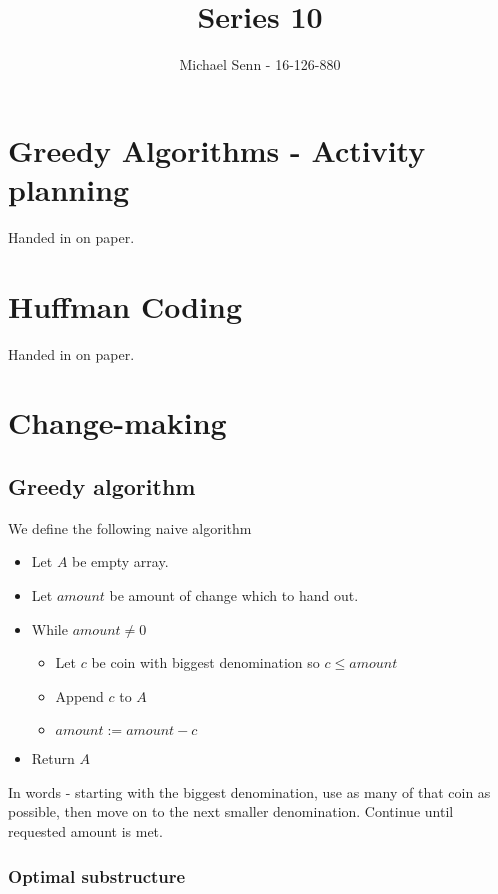 \documentclass[a4paper]{scrartcl}
\title{Series 10}
\author{Michael Senn - 16-126-880}
\date{}
\begin{document}
\maketitle

\section{Greedy Algorithms - Activity planning}

Handed in on paper.

\section{Huffman Coding}

Handed in on paper.

\section{Change-making}

\subsection{Greedy algorithm}

We define the following naive algorithm

\begin{itemize}
	\item Let $A$ be empty array.
	\item Let $amount$  be amount of change which to hand out.
	\item While $amount \neq 0$
		\begin{itemize}
			\item Let $c$ be coin with biggest denomination so $c \leq amount$
			\item Append $c$ to $A$
			\item $amount := amount - c$
		\end{itemize}
	\item Return $A$
\end{itemize}

In words - starting with the biggest denomination, use as many of that coin as
possible, then move on to the next smaller denomination. Continue until
requested amount is met.

\subsubsection{Optimal substructure}
\end{document}

